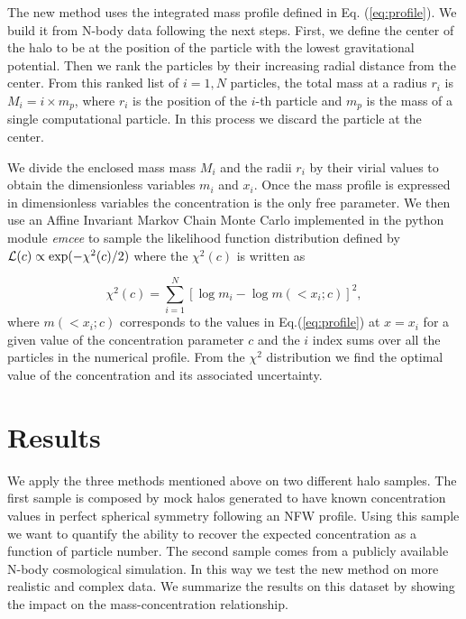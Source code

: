 \documentclass[a4,useAMS,usenatbib,usegraphicx]{mn2e}
\begin{document}
The new method uses the integrated mass profile defined in
Eq. (\ref{eq:profile}).
We build it from N-body data following the next steps.
First, we define the center of the halo to be at the position of the
particle with the lowest gravitational potential.  
Then we rank the particles by their increasing radial distance from
the center. 
From this ranked list of $i=1,N$ particles, the total mass at a radius
$r_i$ is $M_i=i\times m_p$, where $r_i$ is the position of the $i$-th
particle and $m_p$ is the mass of a single computational particle. 
In this process we discard the particle at the center. 

We divide the enclosed mass mass $M_i$ and the radii $r_i$ by their
virial values to obtain the dimensionless variables $m_i$ and $x_i$.
Once the mass profile is expressed in dimensionless variables the
concentration is the only free parameter. 
We then use an Affine Invariant Markov Chain Monte Carlo implemented in the
python module {\em emcee} \citep{emcee} to sample the likelihood
function distribution defined by ${\cal L}(c)\propto
\exp(-\chi^2(c)/2)$ where the $\chi^2(c)$ is 
written as

\begin{equation}
\chi^2(c)= \sum_{i=1}^{N}[\log m_i - \log m(< x_i;c)]^2,
\end{equation}
%
where $m(<x_i;c)$ corresponds to the values in Eq.(\ref{eq:profile})
at $x=x_i$ for a given value of the concentration parameter $c$ and
the $i$ index sums over all the particles in the numerical profile.
From the $\chi^2$ distribution we find the optimal value of the
concentration and its associated uncertainty.


\section{Results}
\label{sec:results}

We apply the three methods mentioned above on two different halo
samples.
The first sample is composed by mock halos generated to have known
concentration values in perfect spherical symmetry following an NFW
profile.    
Using this sample we want to quantify the ability to recover the
expected concentration as a function of particle number.
The second sample comes from a publicly available N-body cosmological
simulation.  
In this way we test the new method on more realistic and complex
data. 
We summarize the results on this dataset by showing the impact on the
mass-concentration relationship.
\end{document}
